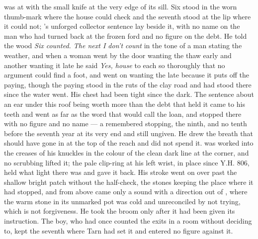 \scenebreak

 was at  with the small knife at the very edge of its sill. Six stood in the worn thumb-mark where the house could check and the seventh stood at the lip where it could not; 's unforged collector sentence lay beside it, with no name on the man who had turned back at the frozen ford and no figure on the debt. He told the wood \emph{Six counted. The next I don't count} in the tone of a man stating the weather, and when a woman went by the door wanting the thaw early and another wanting it late he said \emph{Yes, house} to each so thoroughly that no argument could find a foot, and went on wanting the late because it puts off the paying, though the paying stood in the ruts of the clay road and had stood there since the water went. His chest had been tight since the dark. The sentence about an ear under this roof being worth more than the debt that held it came to his teeth and went as far as the word that would call the loan, and stopped there with no figure and no name --- a remembered stopping, the ninth, and no tenth before the seventh year at its very end and still ungiven. He drew the breath that should have gone in at the top of the reach and did not spend it.  was worked into the creases of his knuckles in the colour of the clean dark line at the corner, and no scrubbing lifted it; the pale clip-ring at his left wrist, in place since Y.H. 806, held what light there was and gave it back. His stroke went on over  past the shallow bright patch without the half-check, the stones keeping the place where it had stopped, and from above came only a sound with a direction out of , where the warm stone in its unmarked pot was cold and unreconciled by not trying, which is not forgiveness. He took the broom only after it had been given its instruction. The boy, who had once counted the exits in a room without deciding to, kept the seventh where Tarn had set it and entered no figure against it.

\scenebreak


